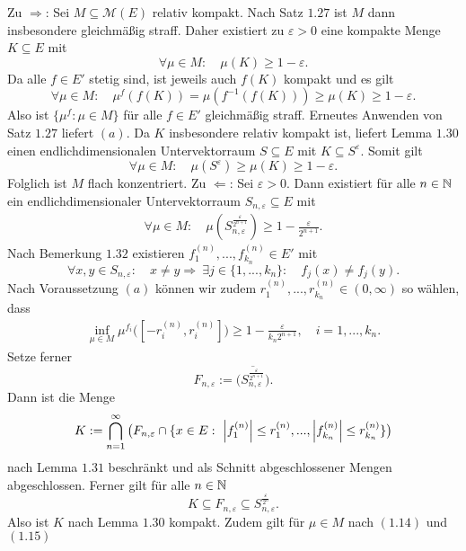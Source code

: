 \begin{proof*}
    Zu $\Rightarrow$: 
    Sei $M \subseteq \mathcal{M}(E)$ relativ kompakt. Nach Satz $1.27$ ist $M$ dann insbesondere gleichmäßig straff. 
    Daher existiert zu $\varepsilon > 0$ eine kompakte Menge $K \subseteq E$ mit 
    $$
        \forall \mu \in M: \quad \mu(K) \geq 1 - \varepsilon.   
    $$ 
    Da alle $f \in E'$ stetig sind, ist jeweils auch $f(K)$ kompakt und es gilt
    $$
        \forall \mu \in M: \quad \mu^f(f(K)) = \mu(f^{-1}(f(K))) \geq \mu(K) \geq 1 - \varepsilon. 
    $$
    Also ist $\{\mu^f : \mu \in M\}$ für alle $f \in E'$ gleichmäßig straff. Erneutes Anwenden von Satz $1.27$  liefert $(a)$. 
    Da $K$ insbesondere relativ kompakt ist, liefert Lemma $1.30$ einen endlichdimensionalen Untervektorraum $S \subseteq E$ mit $K \subseteq S^{\varepsilon}$. Somit gilt
    $$
        \forall \mu \in M: \quad \mu(S^{\varepsilon}) \geq \mu(K) \geq 1 - \varepsilon.
    $$
    Folglich ist $M$ flach konzentriert. 
    \newline 
    Zu $\Leftarrow$: 
    Sei $\varepsilon > 0$. Dann existiert für alle $n \in \mathbb{N}$ ein endlichdimensionaler Untervektorraum $S_{n, \varepsilon} \subseteq E$ mit 
    \begin{align}
        \forall \mu \in M: \quad \mu(S_{n, \varepsilon}^{\frac{\varepsilon}{2^{n+1}}}) \geq 1 - \frac{\varepsilon}{2^{n+1}}.
    \end{align}
    Nach Bemerkung $1.32$ existieren $f_1^{(n)},...,f_{k_n}^{(n)} \in E'$ mit 
    $$
        \forall x,y \in S_{n, \varepsilon}: \quad x \neq y \Rightarrow \ \exists j \in \{1,...,k_n\}: \quad f_j(x) \neq f_j(y). 
    $$
    Nach Voraussetzung $(a)$ können wir zudem $r_1^{(n)},...,r_{k_n}^{(n)} \in (0, \infty)$ so wählen, dass
    \begin{align}
        \inf_{\mu \in M} \mu^{f_i}\big([-r_i^{(n)}, r_i^{(n)}]\big) \geq 1 - \frac{\varepsilon}{k_n 2^{n+1}}, \quad i=1,...,k_n.
    \end{align}
    Setze ferner
    $$
        F_{n,\varepsilon} := \overline{\big(S_{n,\varepsilon}^{\frac{\varepsilon}{2^{n+1}}}\big)}.
    $$
    Dann ist die Menge 
    $$
        K := \bigcap_{n =1}^{\infty}\big(F_{n, \varepsilon} \cap\{x \in E: \ \left| f_1^{(n)} \right|\leq r_1^{(n)},...,\left| f_{k_n}^{(n)} \right|\leq r_{k_n}^{(n)}\}\big)
    $$
    nach Lemma $1.31$ beschränkt und als Schnitt abgeschlossener Mengen abgeschlossen. Ferner gilt für alle $n \in \mathbb{N}$
    $$
        K \subseteq  F_{n, \varepsilon} \subseteq S_{n,\varepsilon}^{\frac{\varepsilon}{2^n}}.
    $$
    Also ist $K$ nach Lemma $1.30$ kompakt. Zudem gilt für $\mu \in M$ nach $(1.14)$ und $(1.15)$

\end{proof*}
